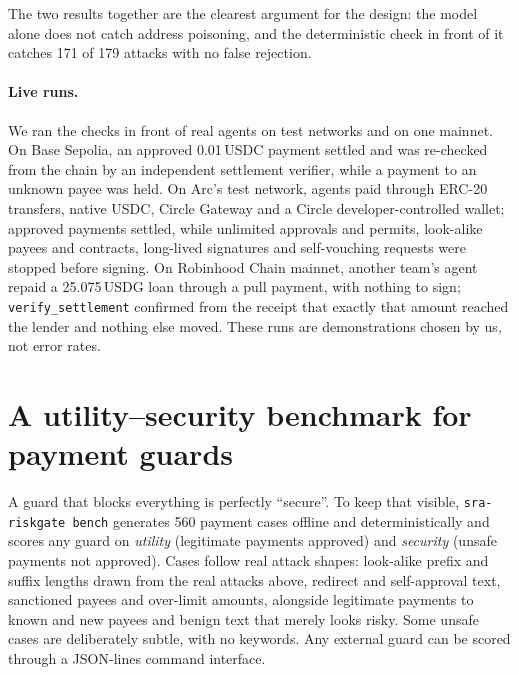\documentclass[11pt]{article}
\newcommand{\code}[1]{\texttt{#1}}
\begin{document}
The two results together are the clearest argument for the design: the model alone does not catch address poisoning, and the deterministic check in front of it catches 171 of 179 attacks with no false rejection.

\paragraph{Live runs.} We ran the checks in front of real agents on test networks and on one mainnet. On Base Sepolia, an approved 0.01\,USDC payment settled and was re-checked from the chain by an independent settlement verifier, while a payment to an unknown payee was held. On Arc's test network, agents paid through ERC-20 transfers, native USDC, Circle Gateway and a Circle developer-controlled wallet; approved payments settled, while unlimited approvals and permits, look-alike payees and contracts, long-lived signatures and self-vouching requests were stopped before signing. On Robinhood Chain mainnet, another team's agent repaid a 25.075\,USDG loan through a pull payment, with nothing to sign; \code{verify\_settlement} confirmed from the receipt that exactly that amount reached the lender and nothing else moved. These runs are demonstrations chosen by us, not error rates.

\section{A utility--security benchmark for payment guards}\label{sec:guardbench}

A guard that blocks everything is perfectly ``secure''. To keep that visible, \code{sra-riskgate bench} generates 560 payment cases offline and deterministically and scores any guard on \emph{utility} (legitimate payments approved) and \emph{security} (unsafe payments not approved). Cases follow real attack shapes: look-alike prefix and suffix lengths drawn from the real attacks above, redirect and self-approval text, sanctioned payees and over-limit amounts, alongside legitimate payments to known and new payees and benign text that merely looks risky. Some unsafe cases are deliberately subtle, with no keywords. Any external guard can be scored through a JSON-lines command interface.
\end{document}
